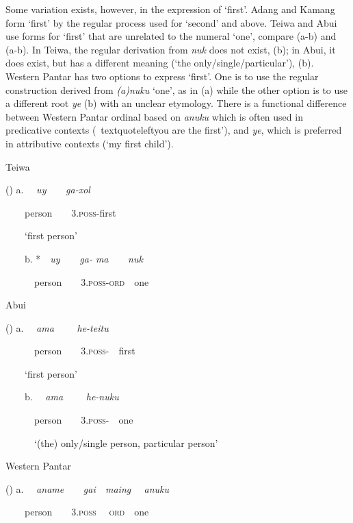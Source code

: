 Some variation exists, however, in the expression of {\textquoteleft}first{\textquoteright}. Adang and Kamang form {\textquoteleft}first{\textquoteright} by the regular process used for {\textquoteleft}second{\textquoteright} and above. Teiwa and Abui use forms for {\textquoteleft}first{\textquoteright} that are unrelated to the numeral {\textquoteleft}one{\textquoteright}, compare (a-b) and (a-b). In Teiwa, the regular derivation from \textit{nuk }does not exist, (b); in Abui, it does exist, but has a different meaning ({\textquoteleft}the only/single/particular{\textquoteright}), (b). Western Pantar has two options to express {\textquoteleft}first{\textquoteright}. One is to use the regular construction derived from \textit{(a)nuku} {\textquoteleft}one{\textquoteright}, as in (a) while the other option is to use a different root \textit{ye }(b) with an unclear etymology. There is a functional difference between Western Pantar ordinal based on \textit{anuku} which is often used in predicative contexts ({\
textquoteleft}you are the first{\textquoteright}),\textit{ }and \textit{ye}, which is preferred in attributive contexts ({\textquoteleft}my first child{\textquoteright}). 

Teiwa 

\label{bkm:Ref342651040}() a. \ \ \textit{uy\ \ \ \ ga-xol}

\ \ \ \ person\ \ \ \ 3\textsc{.poss-}first

\ \ \ \ {\textquoteleft}first person{\textquoteright}

\ \  \ \ b. *\ \ \textit{uy\ \ \ \ ga- ma\ \ \ \ nuk}

\ \ \ \ \ \ person\ \ \ \ 3\textsc{.poss-ord\ \ }one

Abui

\label{bkm:Ref342651068}() a. \ \ \textit{ama \ \ \ \ he-teitu}

\ \ \ \ \ \ person\ \ \ \ 3\textsc{.poss-\ \ }first  

\ \ \ \ {\textquoteleft}first person{\textquoteright}

\ \  \ \ b. \ \ \textit{ama \ \ \ \ he-nuku}

\ \ \ \ \ \ person\ \ \ \ 3\textsc{.poss-\ \ }one

\ \ \ \ \ \ {\textquoteleft}(the) only/single person,  particular person{\textquoteright}

Western Pantar

\label{bkm:Ref342651067}() a. \ \ \textit{aname\ \ \ \ gai\ \ maing \ \ anuku}

\ \ \ \ person\ \ \ \ 3\textsc{.poss \ \ ord\ \ }one

